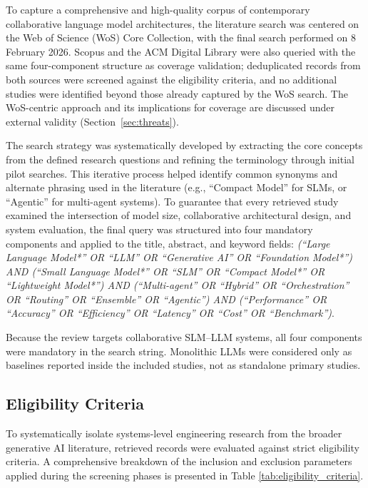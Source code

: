 To capture a comprehensive and high-quality corpus of contemporary collaborative language model architectures, the literature search was centered on the Web of Science (WoS) Core Collection, with the final search performed on 8 February 2026. Scopus and the ACM Digital Library were also queried with the same four-component structure as coverage validation; deduplicated records from both sources were screened against the eligibility criteria, and no additional studies were identified beyond those already captured by the WoS search. The WoS-centric approach and its implications for coverage are discussed under external validity (Section~\ref{sec:threats}).

The search strategy was systematically developed by extracting the core concepts from the defined research questions and refining the terminology through initial pilot searches. This iterative process helped identify common synonyms and alternate phrasing used in the literature (e.g., ``Compact Model'' for SLMs, or ``Agentic'' for multi-agent systems). To guarantee that every retrieved study examined the intersection of model size, collaborative architectural design, and system evaluation, the final query was structured into four mandatory components and applied to the title, abstract, and keyword fields: \textit{(``Large Language Model*'' OR ``LLM'' OR ``Generative AI'' OR ``Foundation Model*'') AND (``Small Language Model*'' OR ``SLM'' OR ``Compact Model*'' OR ``Lightweight Model*'') AND (``Multi-agent'' OR ``Hybrid'' OR ``Orchestration'' OR ``Routing'' OR ``Ensemble'' OR ``Agentic'') AND (``Performance'' OR ``Accuracy'' OR ``Efficiency'' OR ``Latency'' OR ``Cost'' OR ``Benchmark'')}.

Because the review targets collaborative SLM--LLM systems, all four components were mandatory in the search string. Monolithic LLMs were considered only as baselines reported inside the included studies, not as standalone primary studies.

\subsection{Eligibility Criteria}
\label{sec:eligibility_criteria}

To systematically isolate systems-level engineering research from the broader generative AI literature, retrieved records were evaluated against strict eligibility criteria. A comprehensive breakdown of the inclusion and exclusion parameters applied during the screening phases is presented in Table \ref{tab:eligibility_criteria}.

